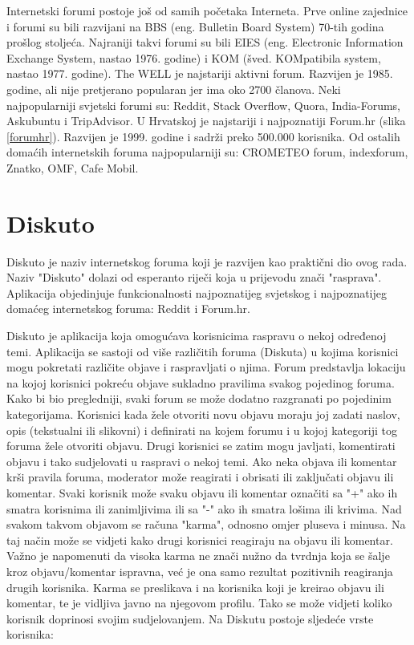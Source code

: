 \documentclass{foi}
\begin{document}
Internetski forumi postoje još od samih početaka Interneta. Prve online zajednice i forumi su bili razvijani na BBS (eng. Bulletin Board System) 70-tih godina prošlog stoljeća. Najraniji takvi forumi su bili EIES (eng. Electronic Information Exchange System, nastao 1976. godine) i KOM (šved. KOMpatibila system, nastao 1977. godine). The WELL je najstariji aktivni forum. Razvijen je 1985. godine, ali nije pretjerano popularan jer ima oko 2700 članova. \cite{forumhistory} Neki najpopularniji svjetski forumi su: Reddit, Stack Overflow, Quora, India-Forums, Askubuntu i TripAdvisor. \cite{topforums} U Hrvatskoj je najstariji i najpoznatiji Forum.hr (slika \ref{forumhr}). Razvijen je 1999. godine i sadrži preko 500.000 korisnika. \cite{forumhr} Od ostalih domaćih internetskih foruma najpopularniji su: CROMETEO forum, indexforum, Znatko, OMF, Cafe Mobil. \cite{forumiuhrvatskoj} 

\section{Diskuto}

Diskuto je naziv internetskog foruma koji je razvijen kao praktični dio ovog rada. Naziv "Diskuto" dolazi od esperanto riječi koja u prijevodu znači "rasprava". Aplikacija objedinjuje funkcionalnosti najpoznatijeg svjetskog i najpoznatijeg domaćeg internetskog foruma: Reddit i Forum.hr.

Diskuto je aplikacija koja omogućava korisnicima raspravu o nekoj određenoj temi. Aplikacija se sastoji od više različitih foruma (Diskuta) u kojima korisnici mogu pokretati različite objave i raspravljati o njima. Forum predstavlja lokaciju na kojoj korisnici pokreću objave sukladno pravilima svakog pojedinog foruma. Kako bi bio pregledniji, svaki forum se može dodatno razgranati po pojedinim kategorijama. Korisnici kada žele otvoriti novu objavu moraju joj zadati naslov, opis (tekstualni ili slikovni) i definirati na kojem forumu i u kojoj kategoriji tog foruma žele otvoriti objavu. Drugi korisnici se zatim mogu javljati, komentirati objavu i tako sudjelovati u raspravi o nekoj temi. Ako neka objava ili komentar krši pravila foruma, moderator može reagirati i obrisati ili zaključati objavu ili komentar. Svaki korisnik može svaku objavu ili komentar označiti sa "+" ako ih smatra korisnima ili zanimljivima ili sa "-" ako ih smatra lošima ili krivima. Nad svakom takvom objavom se računa "karma", odnosno omjer pluseva i minusa. Na taj način može se vidjeti kako drugi korisnici reagiraju na objavu ili komentar. Važno je napomenuti da visoka karma ne znači nužno da tvrdnja koja se šalje kroz objavu/komentar ispravna, već je ona samo rezultat pozitivnih reagiranja drugih korisnika. Karma se preslikava i na korisnika koji je kreirao objavu ili komentar, te je vidljiva javno na njegovom profilu. Tako se može vidjeti koliko korisnik doprinosi svojim sudjelovanjem. Na Diskutu postoje sljedeće vrste korisnika:
\end{document}
